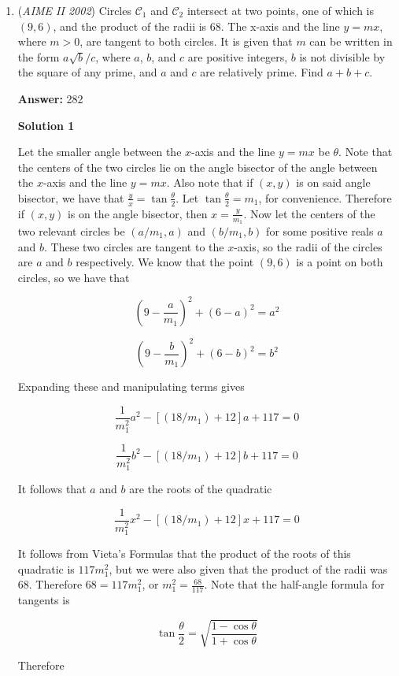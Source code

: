 \begin{enumerate}
 


	\item (\textit{AIME II 2002}) Circles $\mathcal{C}_{1}$ and $\mathcal{C}_{2}$ intersect at two points, one of which is $(9,6)$, and the product of the radii is $68$. The x-axis and the line $y = mx$, where $m > 0$, are tangent to both circles. It is given that $m$ can be written in the form $a\sqrt {b}/c$, where $a$, $b$, and $c$ are positive integers, $b$ is not divisible by the square of any prime, and $a$ and $c$ are relatively prime. Find $a + b + c$.


 
 \textbf{Answer: }282



\textbf{Solution 1}

Let the smaller angle between the $x$-axis and the line $y=mx$ be $\theta$. Note that the centers of the two circles lie on the angle bisector of the angle between the $x$-axis and the line $y=mx$. Also note that if $(x,y)$ is on said angle bisector, we have that $\frac{y}{x}=\tan{\frac{\theta}{2}}$.  Let $\tan{\frac{\theta}{2}}=m_1$, for convenience. Therefore if $(x,y)$ is on the angle bisector, then $x=\frac{y}{m_1}$. Now let the centers of the two relevant circles be $(a/m_1 , a)$ and $(b/m_1 , b)$ for some positive reals $a$ and $b$. These two circles are tangent to the $x$-axis, so the radii of the circles are $a$ and $b$ respectively. We know that the point $(9,6)$ is a point on both circles, so we have that

 
 \[(9-\frac{a}{m_1})^2+(6-a)^2=a^2\]

 \[(9-\frac{b}{m_1})^2+(6-b)^2=b^2\]

 Expanding these and manipulating terms gives

 
 \[\frac{1}{m_1^2}a^2-[(18/m_1)+12]a+117=0\]

 \[\frac{1}{m_1^2}b^2-[(18/m_1)+12]b+117=0\]

 It follows that $a$ and $b$ are the roots of the quadratic

 
 \[\frac{1}{m_1^2}x^2-[(18/m_1)+12]x+117=0\]

 It follows from Vieta's Formulas that the product of the roots of this quadratic is $117m_1^2$, but we were also given that the product of the radii was 68. Therefore $68=117m_1^2$, or $m_1^2=\frac{68}{117}$. Note that the half-angle formula for tangents is

 
 \[\tan{\frac{\theta}{2}}=\sqrt{\frac{1-\cos{\theta}}{1+\cos{\theta}}}\]

 Therefore


\end{enumerate}
